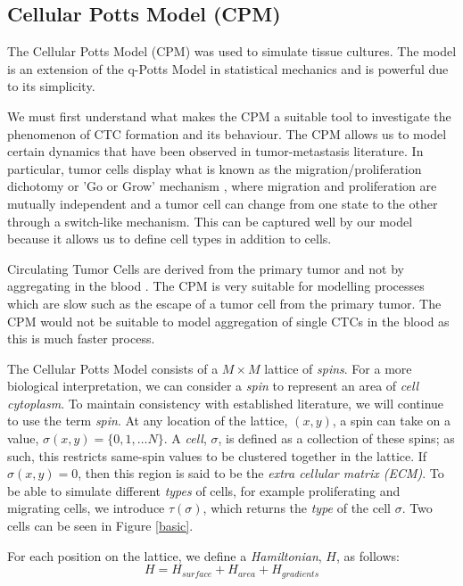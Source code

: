 \documentclass[12pt]{article}
\begin{document}
\subsection{Cellular Potts Model (CPM)}
The Cellular Potts Model (CPM) \cite{Graner1992} was used to simulate tissue cultures. The model is an extension of the q-Potts Model in statistical mechanics and is powerful due to its simplicity. 

We must first understand what makes the CPM a suitable tool to investigate the phenomenon of CTC formation and its behaviour. The CPM allows us to model certain dynamics that have been observed in tumor-metastasis literature. In particular, tumor cells display what is known as the migration/proliferation dichotomy or 'Go or Grow' mechanism \cite{Godlewski2010}\cite{Hatzikirou2012}, where migration and proliferation are mutually independent and a tumor cell can change from one state to the other through a switch-like mechanism. This can be captured well by our model because it allows us to define cell types in addition to cells.

Circulating Tumor Cells are derived from the primary tumor and not by aggregating in the blood \cite{Aceto2014}. The CPM is very suitable for modelling processes which are slow such as the escape of a tumor cell from the primary tumor. The CPM would not be suitable to model aggregation of single CTCs in the blood as this is much faster process. 

The Cellular Potts Model consists of a $M\times M$ lattice of \emph{spins}. For a more biological interpretation, we can consider a \emph{spin} to represent an area of \emph{cell cytoplasm}. To maintain consistency with established literature, we will continue to use the term \emph{spin}. At any location of the lattice, $(x,y)$, a spin can take on a value, $\sigma(x,y) = \{0,1,\ldots N\}$. A \emph{cell}, $\sigma$, is defined as a collection of these spins; as such, this restricts same-spin values to be clustered together in the lattice. If $\sigma(x,y) = 0$, then this region is said to be the \emph{extra cellular matrix (ECM)}. To be able to simulate different \emph{types} of cells, for example proliferating and migrating cells, we introduce $\tau(\sigma)$, which returns the \emph{type} of the cell $\sigma$. Two cells can be seen in Figure \ref{basic}.

For each position on the lattice, we define a \emph{Hamiltonian}, $H$, as follows:
\begin{equation}
	H = H_{surface} + H_{area} + H_{gradients}
	\label{hamiltonian}
\end{equation}
\end{document}
